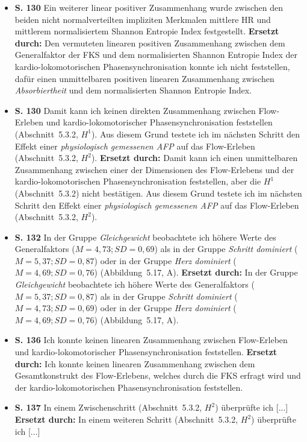 \documentclass[12pt, twoside=semi, DIV=calc, pagesize, parskip=half, listof=totoc, bibliography=totoc, open=right, listof=nochaptergap, pointlessnumbers, final]{scrreprt}
\begin{document}
\begin{itemize}
	\item \textbf{S. 130} Ein weiterer linear positiver Zusammenhang wurde zwischen den beiden nicht normalverteilten impliziten Merkmalen mittlere HR und mittlerem normalisiertem Shannon Entropie Index festgestellt. \textbf{Ersetzt durch:} Den vermuteten linearen positiven Zusammenhang zwischen dem Generalfaktor der FKS und dem normalisierten Shannon Entropie Index der kardio-lokomotorischen Phasensynchronisation konnte ich nicht feststellen, dafür einen unmittelbaren positiven linearen Zusammenhang zwischen \emph{Absorbiertheit} und dem normalisierten Shannon Entropie Index.
	\item \textbf{S. 130} Damit kann ich keinen direkten Zusammenhang zwischen Flow-Erleben und kardio-lokomotorischer Phasensynchronisation feststellen (Abschnitt~5.3.2, $H^1$). Aus diesem Grund testete ich im nächsten Schritt den Effekt einer \emph{physiologisch gemessenen AFP} auf das Flow-Erleben (Abschnitt~5.3.2, $H^2$). \textbf{Ersetzt durch:} Damit kann ich einen unmittelbaren Zusammenhang zwischen einer der Dimensionen des Flow-Erlebens und der kardio-lokomotorischen Phasensynchronisation feststellen, aber die $H^1$ (Abschnitt~5.3.2) nicht bestätigen. Aus diesem Grund testete ich im nächsten Schritt den Effekt einer \emph{physiologisch gemessenen AFP} auf das Flow-Erleben (Abschnitt~5.3.2, $H^2$).
\item \textbf{S. 132} In der Gruppe \emph{Gleichgewicht} beobachtete ich höhere Werte des Generalfaktors ($M = 4{,}73; SD = 0{,}69$) als in der Gruppe \emph{Schritt dominiert} ($M = 5{,}37; SD = 0{,}87$) oder in der Gruppe \emph{Herz dominiert} ($M = 4{,}69; SD = 0{,}76$) (Abbildung~5.17, A). \textbf{Ersetzt durch:} In der Gruppe \emph{Gleichgewicht} beobachtete ich höhere Werte des Generalfaktors ($M = 5{,}37; SD = 0{,}87$) als in der Gruppe \emph{Schritt dominiert} ($M = 4{,}73; SD = 0{,}69$) oder in der Gruppe \emph{Herz dominiert} ($M = 4{,}69; SD = 0{,}76$) (Abbildung~5.17, A).
\item \textbf{S. 136} Ich konnte keinen linearen Zusammenhang zwischen Flow-Erleben und kardio-lokomotorischer Phasensynchronisation feststellen. \textbf{Ersetzt durch:} Ich konnte keinen linearen Zusammenhang zwischen dem Gesamtkonstrukt des Flow-Erlebens, welches durch die FKS erfragt wird und der kardio-lokomotorischen Phasensynchronisation feststellen.
\item \textbf{S. 137} In einem Zwischenschritt (Abschnitt~5.3.2, $H^2$) überprüfte ich [...] \textbf{Ersetzt durch:} In einem weiteren Schritt (Abschnitt~5.3.2, $H^2$) überprüfte ich [...]


\end{itemize}
\end{document}
